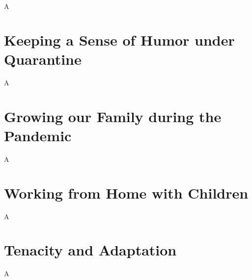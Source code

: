 \documentclass[../../main.tex]{subfiles}
\begin{document}
A

\section{Keeping a Sense of Humor under Quarantine}

A

\section{Growing our Family during the Pandemic}

A

\section{Working from Home with Children}

A

\section{Tenacity and Adaptation}

A
\end{document}

